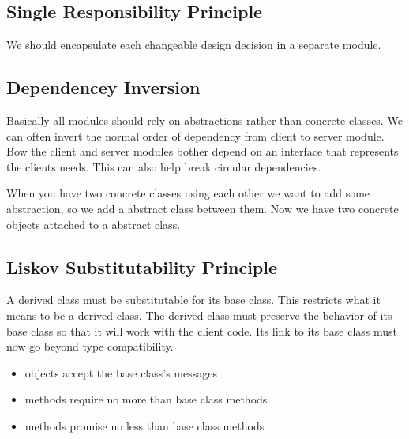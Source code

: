 \documentclass[12pt]{article}
\begin{document}
\subsection{Single Responsibility Principle}
We should encapsulate each changeable design decision in a separate module.

\subsection{Dependencey Inversion}
Basically all modules should rely on abstractions rather than concrete classes. We can often invert the normal order of dependency from client to server module. Bow the client and server modules bother depend on an interface that represents the clients needs. This can also help break circular dependencies.

When you have two concrete classes using each other we want to add some abstraction, so we add a abstract class between them. Now we have two concrete objects attached to a abstract class.

\subsection*{Liskov Substitutability Principle}
A derived class must be substitutable for its base class. This restricts what it means to be a derived class. The derived class must preserve the behavior of its base class so that it will work with the client code. Its link to its base class must now go beyond type compatibility.
\begin{itemize}
    \item objects accept the base class's messages
    \item methods require no more than base class methods
    \item methods promise no less than base class methods
\end{itemize}
\end{document}
